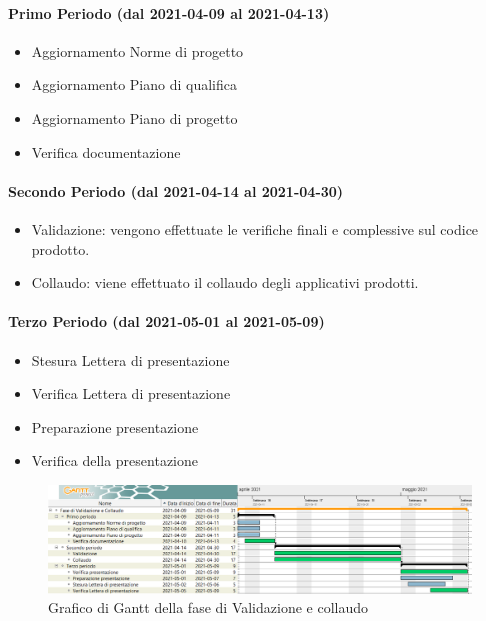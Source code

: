 \paragraph{Primo Periodo (dal 2021-04-09 al 2021-04-13)}
\begin{itemize}
	\item Aggiornamento Norme di progetto
	\item Aggiornamento Piano di qualifica
	\item Aggiornamento Piano di progetto
	\item Verifica documentazione
\end{itemize}

\paragraph{Secondo Periodo (dal 2021-04-14 al 2021-04-30)}
\begin{itemize}
	\item Validazione: vengono effettuate le verifiche finali e complessive sul codice prodotto.
	\item Collaudo: viene effettuato il collaudo degli applicativi prodotti.
\end{itemize}

\paragraph{Terzo Periodo (dal 2021-05-01 al 2021-05-09)}
\begin{itemize}
	\item Stesura Lettera di presentazione
	\item Verifica Lettera di presentazione
	\item Preparazione presentazione
	\item Verifica della presentazione
\end{itemize}

\begin{landscape}
	\begin{figure}[H]
		\centering
		\includegraphics[width=\linewidth]{res/images/ganttFase4.png}
		\caption{Grafico di Gantt della fase di Validazione e collaudo}
		\label{fig:Gantt Analisi dei requisiti}
	\end{figure}
\end{landscape}


